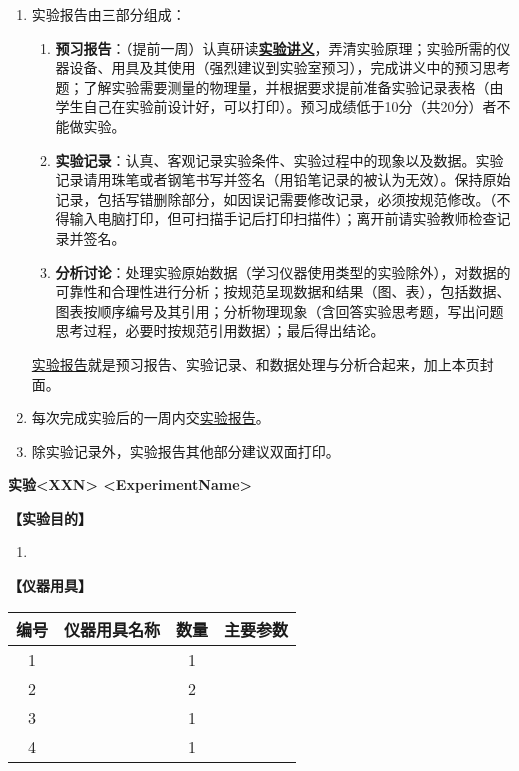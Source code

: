 \documentclass{ctexart}
\numberwithin{equation}{section}%
\newcommand{\ExpTitle}{实验<XXN> <ExperimentName>}
\theoremstyle{ansstyle}
\begin{document}
\begin{enumerate}
    \item 实验报告由三部分组成：
    \begin{enumerate}
        \item \textbf{预习报告}：（提前一周）认真研读\underline{\textbf{实验讲义}}，弄清实验原理；实验所需的仪器设备、用具及其使用（强烈建议到实验室预习），完成讲义中的预习思考题；了解实验需要测量的物理量，并根据要求提前准备实验记录表格（由学生自己在实验前设计好，可以打印）。预习成绩低于10分（共20分）者不能做实验。
        \item \textbf{实验记录}：认真、客观记录实验条件、实验过程中的现象以及数据。实验记录请用珠笔或者钢笔书写并签名（{\color{red}用铅笔记录的被认为无效}）。{\color{red}保持原始记录，包括写错删除部分，如因误记需要修改记录，必须按规范修改。}（不得输入电脑打印，但可扫描手记后打印扫描件）；离开前请实验教师检查记录并签名。
        \item \textbf{分析讨论}：处理实验原始数据（学习仪器使用类型的实验除外），对数据的可靠性和合理性进行分析；按规范呈现数据和结果（图、表），包括数据、图表按顺序编号及其引用；分析物理现象（含回答实验思考题，写出问题思考过程，必要时按规范引用数据）；最后得出结论。
    \end{enumerate}
    \underline{实验报告}就是预习报告、实验记录、和数据处理与分析合起来，加上本页封面。
    \item 每次完成实验后的一周内交\underline{实验报告}。
    \item 除实验记录外，实验报告其他部分建议双面打印。
\end{enumerate}


\begin{center}
    \LARGE{\textbf{\ExpTitle}}
\end{center}

\large{\textbf{【实验目的】}}

\begin{enumerate}
    \item 
\end{enumerate}

\large{\textbf{【仪器用具】}} 
\begin{table}[H]
\begin{center}
    \begin{tabular}{|c|c|c|p{8cm}|}%
        \hline
        编号 & 仪器用具名称 & 数量 & 主要参数 \\
        \hline
        1 &  & 1 &  \\ %
        \hline
        2 &  & 2 &  \\
        \hline
        3  &   & 1 &  \\
        \hline
        4  &   & 1 &  \\
        \hline
    \end{tabular}
\end{center}
\end{table}
\end{document}
